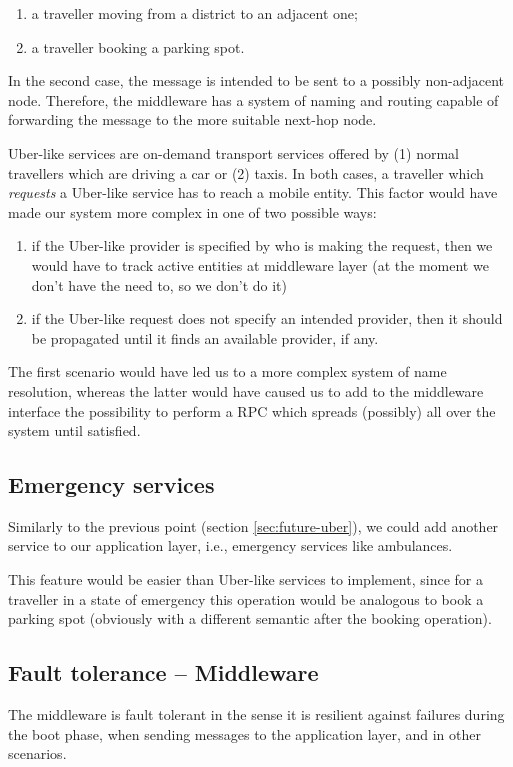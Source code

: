 \begin{enumerate}
  \item a traveller moving from a district to an adjacent one;
  \item a traveller booking a parking spot.
\end{enumerate}

In the second case, the message is intended to be sent to a possibly
non-adjacent node. Therefore, the middleware has a system of naming and routing
capable of forwarding the message to the more suitable next-hop node.

Uber-like services are on-demand transport services offered by (1) normal
travellers which are driving a car or (2) taxis. In both cases, a traveller
which \textit{requests} a Uber-like service has to reach a mobile entity.
This factor would have made our system more complex in one of two possible
ways:

\begin{enumerate}
  \item if the Uber-like provider is specified by who is making the request,
    then we would have to track active entities at middleware layer (at the
    moment we don't have the need to, so we don't do it)
  \item if the Uber-like request does not specify an intended provider, then it
    should be propagated until it finds an available provider, if any.
\end{enumerate}

The first scenario would have led us to a more complex system of name
resolution, whereas the latter would have caused us to add to the middleware
interface the possibility to perform a RPC which spreads (possibly) all over
the system until satisfied.

\subsection{Emergency services}
Similarly to the previous point (section \ref{sec:future-uber}), we could add
another service to our application layer, i.e., emergency services like
ambulances.

This feature would be easier than Uber-like services to implement, since for a
traveller in a state of emergency this operation would be analogous to book a
parking spot (obviously with a different semantic after the booking operation).

\subsection{Fault tolerance -- Middleware}
The middleware is fault tolerant in the sense it is resilient against failures
during the boot phase, when sending messages to the application layer, and in
other scenarios.

